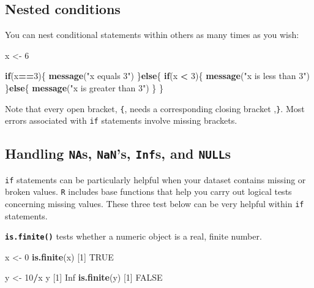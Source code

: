 \documentclass[
]{book}
\newenvironment{Shaded}{\begin{snugshade}}{\end{snugshade}}
\newcommand{\ControlFlowTok}[1]{\textcolor[rgb]{0.13,0.29,0.53}{\textbf{#1}}}
\newcommand{\DecValTok}[1]{\textcolor[rgb]{0.00,0.00,0.81}{#1}}
\newcommand{\KeywordTok}[1]{\textcolor[rgb]{0.13,0.29,0.53}{\textbf{#1}}}
\newcommand{\NormalTok}[1]{#1}
\newcommand{\OperatorTok}[1]{\textcolor[rgb]{0.81,0.36,0.00}{\textbf{#1}}}
\newcommand{\OtherTok}[1]{\textcolor[rgb]{0.56,0.35,0.01}{#1}}
\newcommand{\StringTok}[1]{\textcolor[rgb]{0.31,0.60,0.02}{#1}}
\begin{document}
\hypertarget{nested-conditions}{%
\subsection*{Nested conditions}\label{nested-conditions}}

You can nest conditional statements within others as many times as you wish:

\begin{Shaded}
\begin{Highlighting}[]
\NormalTok{x <-}\StringTok{ }\DecValTok{6}

\ControlFlowTok{if}\NormalTok{(x}\OperatorTok{==}\DecValTok{3}\NormalTok{)\{}
  \KeywordTok{message}\NormalTok{(}\StringTok{"x equals 3"}\NormalTok{)}
\NormalTok{\}}\ControlFlowTok{else}\NormalTok{\{}
  \ControlFlowTok{if}\NormalTok{(x }\OperatorTok{<}\StringTok{ }\DecValTok{3}\NormalTok{)\{}
    \KeywordTok{message}\NormalTok{(}\StringTok{"x is less than 3"}\NormalTok{)}
\NormalTok{  \}}\ControlFlowTok{else}\NormalTok{\{  }
    \KeywordTok{message}\NormalTok{(}\StringTok{"x is greater than 3"}\NormalTok{)}
\NormalTok{  \}}
\NormalTok{\}}
\end{Highlighting}
\end{Shaded}

Note that every open bracket, \texttt{\{}, needs a corresponding closing bracket ,\texttt{\}}. Most errors associated with \texttt{if} statements involve missing brackets.

\hypertarget{handling-nas-nans-infs-and-nulls}{%
\subsection*{\texorpdfstring{Handling \texttt{NA}s, \texttt{NaN}'s, \texttt{Inf}s, and \texttt{NULL}s}{Handling NAs, NaN's, Infs, and NULLs}}\label{handling-nas-nans-infs-and-nulls}}

\texttt{if} statements can be particularly helpful when your dataset contains missing or broken values. \texttt{R} includes base functions that help you carry out logical tests concerning missing values. These three test below can be very helpful within \texttt{if} statements.

\textbf{\texttt{is.finite()}} tests whether a numeric object is a real, finite number.

\begin{Shaded}
\begin{Highlighting}[]
\NormalTok{x <-}\StringTok{ }\DecValTok{0}
\KeywordTok{is.finite}\NormalTok{(x)}
\NormalTok{[}\DecValTok{1}\NormalTok{] }\OtherTok{TRUE}

\NormalTok{y <-}\StringTok{ }\DecValTok{10}\OperatorTok{/}\NormalTok{x}
\NormalTok{y}
\NormalTok{[}\DecValTok{1}\NormalTok{] }\OtherTok{Inf}
\KeywordTok{is.finite}\NormalTok{(y)}
\NormalTok{[}\DecValTok{1}\NormalTok{] }\OtherTok{FALSE}
\end{Highlighting}
\end{Shaded}
\end{document}
